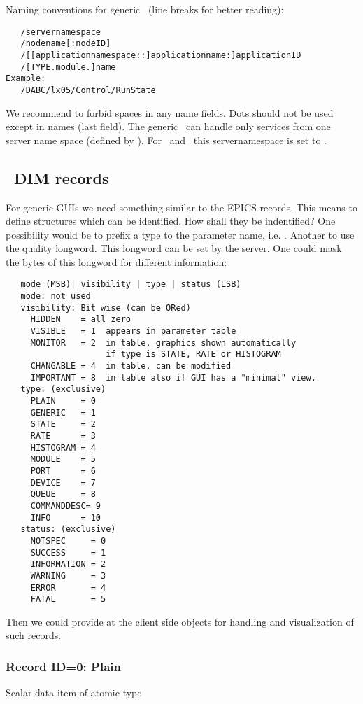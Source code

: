 Naming conventions for generic \gui\ (line breaks for better reading):
{\small \begin{verbatim}
   /servernamespace
   /nodename[:nodeID]
   /[[applicationnamespace::]applicationname:]applicationID
   /[TYPE.module.]name
Example:
   /DABC/lx05/Control/RunState
\end{verbatim}
}
We recommend to forbid spaces in any name fields. Dots should not be used except in names (last field). The generic \gui\ can handle only services from one server name space 
(defined by ). For \dabc\ and \mbs\ this servernamespace is set to .
\subsection{\dabc\ DIM records}
For generic GUIs we need something similar to the EPICS records. This means to define structures which can be identified. How shall they be indentified? One possibility would be to prefix a type to the parameter name, i.e. . Another to use the quality longword. This longword can be set by the server. One could mask the bytes of this longword for different information:
{\small \begin{verbatim}
   mode (MSB)| visibility | type | status (LSB)
   mode: not used
   visibility: Bit wise (can be ORed)
     HIDDEN    = all zero
     VISIBLE   = 1  appears in parameter table
     MONITOR   = 2  in table, graphics shown automatically 
                    if type is STATE, RATE or HISTOGRAM
     CHANGABLE = 4  in table, can be modified
     IMPORTANT = 8  in table also if GUI has a "minimal" view.
   type: (exclusive)
     PLAIN     = 0
     GENERIC   = 1
     STATE     = 2
     RATE      = 3
     HISTOGRAM = 4
     MODULE    = 5
     PORT      = 6
     DEVICE    = 7
     QUEUE     = 8
     COMMANDDESC= 9
     INFO      = 10
   status: (exclusive) 
     NOTSPEC     = 0
     SUCCESS     = 1
     INFORMATION = 2
     WARNING     = 3
     ERROR       = 4
     FATAL       = 5
\end{verbatim}
}

Then we could provide at the client side objects for handling and visualization of such records.

\subsubsection{Record ID=0: Plain}

Scalar data item of atomic type

